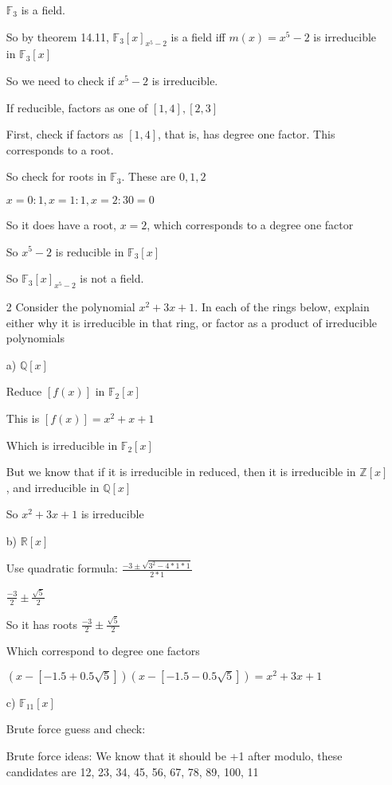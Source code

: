 \documentclass[12pt]{article}
\begin{document}
\begin{itemize}
		$\mathbb{F}_3$ is a field.

		So by theorem 14.11, $\mathbb{F}_3[x]_{x^5-2}$ is a field iff $m(x) = x^5 -2$ is irreducible in $\mathbb{F}_3[x]$

		So we need to check if $x^5-2$ is irreducible.

		If reducible, factors as one of $[1,4], [2,3]$

		First, check if factors as $[1,4]$, that is, has degree one factor. This corresponds to a root. 

		So check for roots in $\mathbb{F}_3$. These are $0,1,2$
	
		$x = 0: 1, x = 1: 1, x = 2: 30 = 0$

		So it does have a root, $x=2$, which corresponds to a degree one factor

		So $x^5 - 2$ is reducible in $\mathbb{F}_3[x]$

		So $\mathbb{F}_3[x]_{x^5-2}$ is not a field.

	\item[2] Consider the polynomial $x^2 + 3x + 1$. In each of the rings below, explain either why it is irreducible in that ring, or factor as a product of irreducible polynomials

		a) $\mathbb{Q}[x]$

		Reduce $[f(x)]$ in $\mathbb{F}_2[x]$

		This is $[f(x)] = x^2 + x + 1$

		Which is irreducible in $\mathbb{F}_2[x]$

		But we know that if it is irreducible in reduced, then it is irreducible in $\mathbb{Z}[x]$, and irreducible in $\mathbb{Q}[x]$

		So $x^2 + 3x + 1$ is irreducible 

		b) $\mathbb{R}[x]$

		Use quadratic formula: $\frac{-3 \pm \sqrt{3^2 - 4*1*1}}{2*1}$

		$\frac{-3}{2} \pm \frac{\sqrt{5}}{2}$

		So it has roots $\frac{-3}{2} \pm \frac{\sqrt{5}}{2}$

		Which correspond to degree one factors

		$(x - [-1.5 + 0.5\sqrt{5}])(x - [-1.5 - 0.5\sqrt{5}]) = x^2 + 3x + 1$
		
		c) $\mathbb{F}_{11}[x]$

		Brute force guess and check:  

		Brute force ideas: We know that it should be +1 after modulo, these candidates are 12, 23, 34, 45, 56, 67, 78, 89, 100, 11


\end{itemize}
\end{document}
